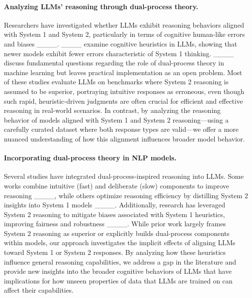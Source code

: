 \paragraph{Analyzing LLMs' reasoning through dual-process theory.} 
Researchers have investigated whether LLMs exhibit reasoning behaviors aligned with System 1 and System 2, particularly in terms of cognitive human-like errors and biases ____. ____ examine cognitive heuristics in LLMs, showing that newer models exhibit fewer errors characteristic of System 1 thinking. ____ discuss fundamental questions regarding the role of dual-process theory in machine learning but leaves practical implementation as an open problem. Most of these studies evaluate LLMs on benchmarks where System 2 reasoning is assumed to be superior, portraying intuitive responses as erroneous, even though such rapid, heuristic-driven judgments are often crucial for efficient and effective reasoning in real-world scenarios. In contrast, by analyzing the reasoning behavior of models aligned with System 1 and System 2 reasoning—using a carefully curated dataset where both response types are valid—we offer a more nuanced understanding of how this alignment influences broader model behavior.

\paragraph{Incorporating dual-process theory in NLP models.} 
Several studies have integrated dual-process-inspired reasoning into LLMs. Some works combine intuitive (fast) and deliberate (slow) components to improve reasoning ____, while others optimize reasoning efficiency by distilling System 2 insights into System 1 models ____. Additionally, research has leveraged System 2 reasoning to mitigate biases associated with System 1 heuristics, improving fairness and robustness ____. While prior work largely frames System 2 reasoning as superior or explicitly builds dual-process components within models, our approach investigates the implicit effects of aligning LLMs toward System 1 or System 2 responses. By analyzing how these heuristics influence general reasoning capabilities, we address a gap in the literature and provide new insights into the broader cognitive behaviors of LLMs that have implications for how unseen properties of data that LLMs are trained on can affect their capabilities.